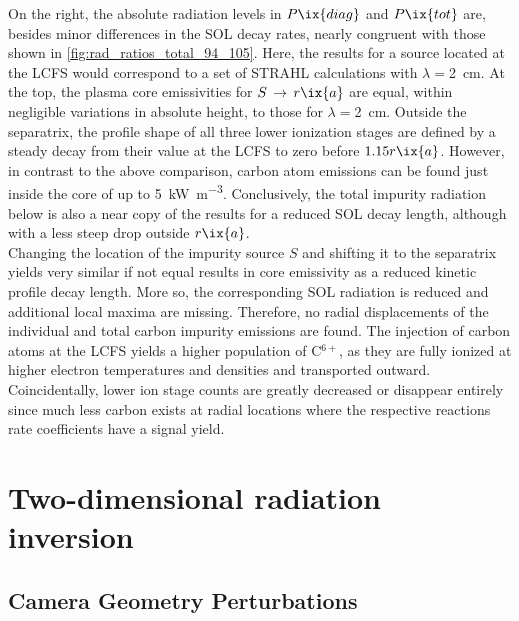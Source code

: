             On the right, the absolute radiation levels in $P\ix{diag}$ and $P\ix{tot}$ are, besides minor differences in the SOL decay rates, nearly congruent with those shown in \cref{fig:rad_ratios_total_94_105}. Here, the results for a source located at the LCFS would correspond to a set of STRAHL calculations with $\lambda=$\SI{2}{\centi\meter}. At the top, the plasma core emissivities for $S\,\rightarrow\,r\ix{a}$ are equal, within negligible variations in absolute height, to those for $\lambda=$\SI{2}{\centi\meter}. Outside the separatrix, the profile shape of all three lower ionization stages are defined by a steady decay from their value at the LCFS to zero before $1.15r\ix{a}$. However, in contrast to the above comparison, carbon atom emissions can be found just inside the core of up to \SI{5}{\kilo\watt\per\cubic\meter}. Conclusively, the total impurity radiation below is also a near copy of the results for a reduced SOL decay length, although with a less steep drop outside $r\ix{a}$.\\%
            Changing the location of the impurity source $S$ and shifting it to the separatrix yields very similar if not equal results in core emissivity as a reduced kinetic profile decay length. More so, the corresponding SOL radiation is reduced and additional local maxima are missing. Therefore, no radial displacements of the individual and total carbon impurity emissions are found. The injection of carbon atoms at the LCFS yields a higher population of C$^{6+}$, as they are fully ionized at higher electron temperatures and densities and transported outward. Coincidentally, lower ion stage counts are greatly decreased or disappear entirely since much less carbon exists at radial locations where the respective reactions rate coefficients have a signal yield.%
%
\chapter{Two-dimensional radiation inversion}\label{apx:mfr}%
%
    \section{Camera Geometry Perturbations}\label{apx:geompertub}%
%
